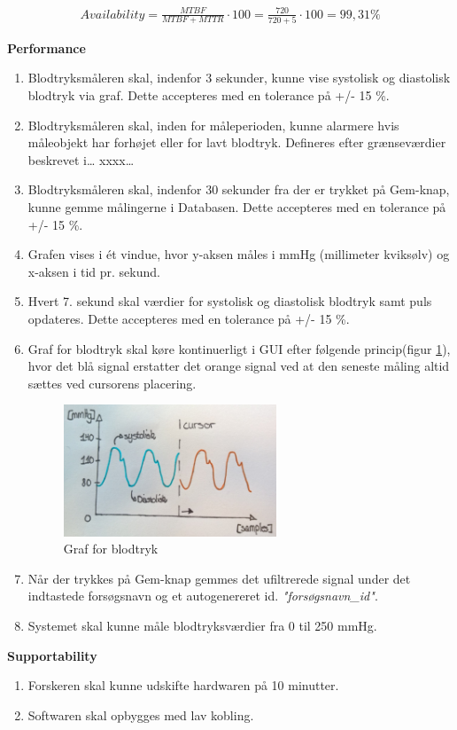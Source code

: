 				\begin{align}
					Availability = \frac{MTBF}{MTBF+MTTR}\cdot100 = \frac{720}{720+5}\cdot100 = 99,31 \%
				\end{align}



\textbf{Performance}
\begin{enumerate}
\item Blodtryksmåleren skal, indenfor 3 sekunder, kunne vise systolisk og diastolisk blodtryk via graf. Dette accepteres med en tolerance på +/- 15 \%.
\item Blodtryksmåleren skal, inden for måleperioden, kunne alarmere hvis måleobjekt har forhøjet eller for lavt blodtryk. Defineres efter grænseværdier beskrevet i… xxxx…
\item Blodtryksmåleren skal, indenfor 30 sekunder fra der er trykket på Gem-knap, kunne gemme målingerne i Databasen.  Dette accepteres med en tolerance på +/- 15 \%.
\item Grafen vises i ét vindue, hvor y-aksen måles i mmHg (millimeter kviksølv) og x-aksen i tid pr. sekund. 
\item Hvert 7. sekund skal værdier for systolisk og diastolisk blodtryk samt puls opdateres. Dette accepteres med en tolerance på +/- 15 \%.
\item Graf for blodtryk skal køre kontinuerligt i GUI efter følgende princip(figur \ref{fig:Graf for blodtryks visning}), hvor det blå signal erstatter det orange signal ved at den seneste måling altid sættes ved cursorens placering.
\begin{figure}[H]
	\centering
	\includegraphics[width=0.6\textwidth]{Figurer/Cursor}
	\caption{Graf for blodtryk}
	\label{fig:Graf for blodtryks visning}
\end{figure}

\item Når der trykkes på Gem-knap gemmes det ufiltrerede signal under det indtastede forsøgsnavn og et autogenereret id. \textit{"forsøgsnavn\_id"}.
\item Systemet skal kunne måle blodtryksværdier fra 0 til 250 mmHg.
\end{enumerate}


\textbf{Supportability}
\begin{enumerate}
\item Forskeren skal kunne udskifte hardwaren på 10 minutter. 
\item Softwaren skal opbygges med lav kobling. 
\end{enumerate}
















